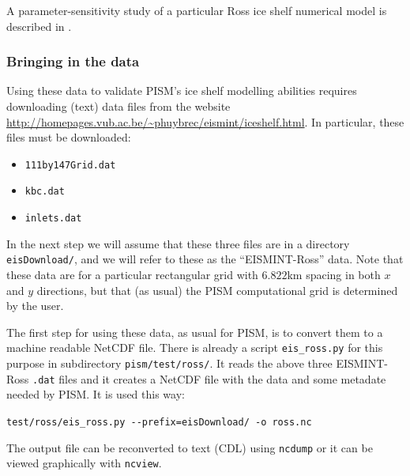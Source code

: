 \documentclass[11pt,final]{amsart}
\begin{document}
A parameter-sensitivity study of a particular Ross ice shelf numerical model is described in \cite{HumbertGreveHutter}.

\subsubsection{Bringing in the data}  Using these data to validate PISM's ice shelf modelling abilities requires downloading (text) data files from the website \url{http://homepages.vub.ac.be/~phuybrec/eismint/iceshelf.html}.  In particular, these files must be downloaded:
\begin{itemize}
\item \verb|111by147Grid.dat|
\item \verb|kbc.dat|
\item \verb|inlets.dat|
\end{itemize}
In the next step we will assume that these three files are in a directory \verb|eisDownload/|, and we will refer to these as the ``EISMINT-Ross'' data.  Note that these data are for a particular rectangular grid with $6.822$km spacing in both $x$ and $y$ directions, but that (as usual) the PISM computational grid is determined by the user.

The first step for using these data, as usual for PISM, is to convert them to a machine readable NetCDF file.  There is already a script \verb|eis_ross.py| for this purpose in subdirectory \verb|pism/test/ross/|.  It  reads the above three EISMINT-Ross \verb|.dat| files and it creates a NetCDF file with the data and some metadate needed by PISM.  It is used this way:

\verb|test/ross/eis_ross.py --prefix=eisDownload/ -o ross.nc|

\noindent The output file can be reconverted to text (CDL) using \verb|ncdump| or it can be viewed graphically with \verb|ncview|.
\end{document}
